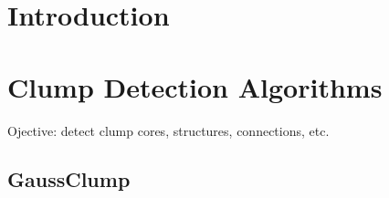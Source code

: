 \documentclass[manuscript]{aastex}
\begin{document}




\section{Introduction}

\section{Clump Detection Algorithms}

Ojective: detect clump cores, structures, connections, etc.

\subsection{GaussClump}
\end{document}

